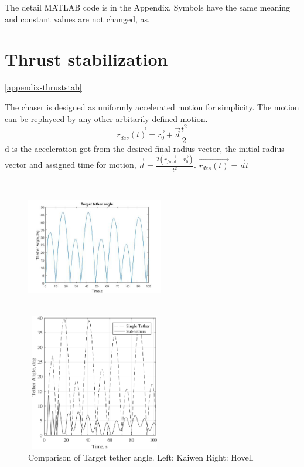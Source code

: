 The detail MATLAB code is in the Appendix. Symbols have the same meaning and constant values are not changed, as\cite{hovell2017experimental}. 

\section{Thrust stabilization}\ref{appendix-thruststab}

The chaser is designed as uniformly accelerated motion for simplicity. The motion can be replayced by any other arbitarily defined motion. $$\overrightarrow{r_{des}(t)}=\overrightarrow{r_0}+\overrightarrow{d}\frac{t^2}{2}$$ d is the acceleration got from the desired final radius vector, the initial radius vector and assigned time for motion, $\overrightarrow{d} = \frac{2(\overrightarrow{r_{final}}-\overrightarrow{r_0})}{t^2}$.
$\overrightarrow{\dot{r_{des}}(t)}=\overrightarrow{d}t$ 


\begin{figure}[htbp]
\centering
\begin{minipage}[t]{0.48\textwidth}
\centering
\includegraphics[width=6cm,height=6cm]{fig/simulation/ThrustStable/Targettetherangle.jpg}
\end{minipage}
\begin{minipage}[t]{0.48\textwidth}
\centering
\includegraphics[width=6cm,height=6cm]{fig/simulation/ThrustStable/Targettetheranglesample.jpg}
\end{minipage}
\caption{Comparison of Target tether angle. Left: Kaiwen	Right: Hovell}
\end{figure}

